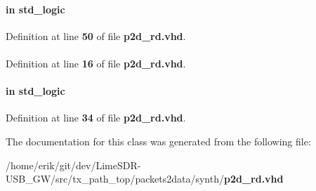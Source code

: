 \paragraph[{smpl\+\_\+buff\+\_\+almost\+\_\+full}]{ {\bfseries \textcolor{keywordflow}{in}\textcolor{vhdlchar}{ }} {\bfseries \textcolor{comment}{std\+\_\+logic}\textcolor{vhdlchar}{ }} \hspace{0.3cm}{\ttfamily [Port]}}\label{classp2d__rd_a898ee71dc167b0e8a2ac3f2fac8aad04}


Definition at line {\bf 50} of file {\bf p2d\+\_\+rd.\+vhd}.

\paragraph[{std\+\_\+logic\+\_\+1164}]{\hspace{0.3cm}{\ttfamily [Package]}}\label{classp2d__rd_acd03516902501cd1c7296a98e22c6fcb}


Definition at line {\bf 16} of file {\bf p2d\+\_\+rd.\+vhd}.

\paragraph[{synch\+\_\+dis}]{ {\bfseries \textcolor{keywordflow}{in}\textcolor{vhdlchar}{ }} {\bfseries \textcolor{comment}{std\+\_\+logic}\textcolor{vhdlchar}{ }} \hspace{0.3cm}{\ttfamily [Port]}}\label{classp2d__rd_a93cdae42f0436d98560fdcae6b2240f1}


Definition at line {\bf 34} of file {\bf p2d\+\_\+rd.\+vhd}.



The documentation for this class was generated from the following file\+:\begin{DoxyCompactItemize}
\item 
/home/erik/git/dev/\+Lime\+S\+D\+R-\/\+U\+S\+B\+\_\+\+G\+W/src/tx\+\_\+path\+\_\+top/packets2data/synth/{\bf p2d\+\_\+rd.\+vhd}\end{DoxyCompactItemize}
